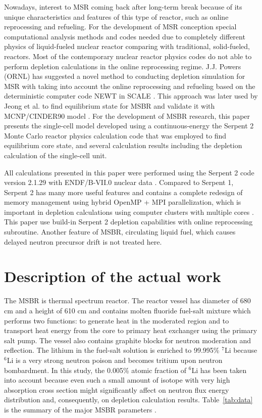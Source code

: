 \documentclass{anstrans}
\begin{document}
Nowadays, interest to \gls{MSR} coming back after long-term break because of its unique characteristics and features of this type of reactor, such as online reprocessing and refueling. For the development of \gls{MSR} conception special computational analysis methods and codes needed due to completely different physics of liquid-fueled nuclear reactor comparing with traditional, solid-fueled, reactors. Most of the contemporary nuclear reactor physics codes do not able to perform depletion calculations in the online reprocessing regime. J.J. Powers (\gls{ORNL}) has suggested a novel method to conducting depletion simulation for \gls{MSR} with taking into account the online reprocessing and refueling based on the deterministic computer code NEWT in SCALE \cite{powers_new_2013}. This approach was later used by Jeong et al. to find equilibrium state for \gls{MSBR} and validate it with \gls{MCNP}/CINDER90 model \cite{jeong_equilibrium_2016}. For the development of \gls{MSBR} research, this paper presents the single-cell model developed using a continuous-energy the Serpent 2 Monte Carlo reactor physics calculation code that was employed to find equilibrium core state, and several calculation results including the depletion calculation of the single-cell unit.

All calculations presented in this paper were performed using the Serpent 2 code version 2.1.29 with ENDF/B-VII.0
nuclear data \cite{leppanen_serpent_2012,chadwick_endf/b-vii.0:_2006}. Compared to Serpent 1, Serpent 2 has many more useful features and contains a complete redesign of memory management using hybrid OpenMP + MPI parallelization, which is important in depletion calculations using computer clusters with multiple cores \cite{leppanen_serpent_2015}. This paper use build-in Serpent 2 depletion capabilities with online reprocessing subroutine. Another feature of \gls{MSBR}, circulating
liquid fuel, which causes delayed neutron precursor drift is not treated here.

\section{Description of the actual work}
The \gls{MSBR} is thermal spectrum reactor. The reactor vessel has diameter of 680 cm and a height of 610 cm and contains molten fluoride fuel-salt mixture which performs two functions: to generate heat in the moderated region and to transport heat energy from the core to primary heat exchanger using the primary salt pump. The vessel also contains graphite blocks for neutron moderation and reflection. The lithium in the fuel-salt solution is enriched to 99.995\% $^7$Li because $^6$Li is a very strong neutron poison and becomes tritium upon neutron bombardment. In this study, the 0.005\% atomic fraction of $^6$Li has been taken into account because even such a small amount of isotope with very high absorption cross section might significantly affect on neutron flux energy distribution and, consequently, on depletion calculation results. Table~\ref{tab:data} is the summary of the major \gls{MSBR} parameters \cite{robertson_conceptual_1971}. 
\end{document}

